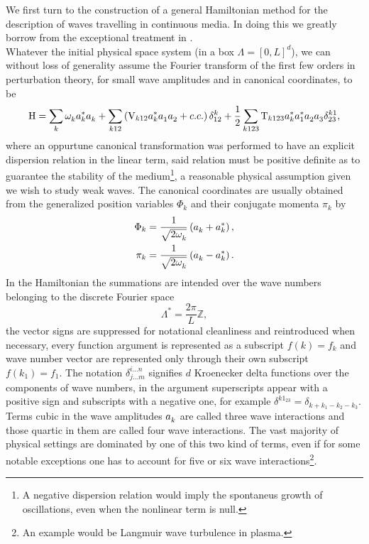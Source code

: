 We first turn to the construction of a general Hamiltonian method for the description of waves travelling in continuous media. In doing this
we greatly borrow from the exceptional treatment in \cite{Zakharov}. \\
Whatever the initial physical space system (in a box $\Lambda = [0,L]^d$), we can without loss of generality assume the Fourier transform of the first few orders in 
perturbation theory, for small wave amplitudes and in canonical coordinates, to be
\begin{equation}
    \mathrm{H} = \sum_k \omega^{}_k a_k^{*} a_k^{} + \sum_{k12} \left( \mathrm{V}_{k12} a_k^{*}a_1^{}a_2^{} + c.c.  \right)\delta^{k}_{12} \\
    +\frac{1}{2}\sum_{k123} \mathrm{T}_{k123} a_k^{*}a_1^{*}a_2^{}a_3^{}\delta^{k1}_{23},
    \label{HamOrig}
\end{equation}
where an oppurtune canonical transformation was performed to have an explicit dispersion relation in the linear term, said relation must be positive definite 
as to guarantee the stability of the medium\footnote{A negative dispersion relation would imply the spontaneus growth of oscillations, even when the nonlinear
term is null.}, a reasonable physical assumption given we wish to study weak waves. The canonical coordinates are usually obtained from the generalized position
variables $\Phi_k$ and their conjugate momenta $\pi_k$ by
\begin{align*}
    \Phi_k &= \frac{1}{\sqrt{2\omega^{}_k}}\left(a_k^{} + a_k^{*}\right) , \\
    \pi_k &= \frac{1}{\sqrt{2\omega^{}_k}}\left(a_k^{} - a_k^{*} \right) .
\end{align*}
In the Hamiltonian the summations are intended over the wave numbers belonging to the discrete Fourier space 
\begin{equation}
    \Lambda^* = \frac{2\pi}{L}\mathbb{Z},
\end{equation}
the vector signs are suppressed for notational cleanliness and reintroduced when necessary, every function argument is represented as a subscript $f(k)=f_k$ and wave number vector are 
represented only through their own subscript $f(k_1)=f_1$. The notation $\delta^{i\dots n}_{j \dots m}$ signifies $d$ Kroenecker delta functions over the components of 
wave numbers, 
in the argument superscripts appear with a positive sign and subscripts with a negative one, for example $\delta^{k1_23} = \delta_{k + k_1 - k_2 - k_3}$.\\
Terms cubic in the wave amplitudes $a_k^{}$ are called three wave interactions and those quartic in them are called four wave interactions. The vast majority of physical 
settings are dominated by one of this two kind of terms, even if for some notable exceptions one has to account for five or six wave interactions\footnote{An example would be
Langmuir wave turbulence in plasma.}. \\

